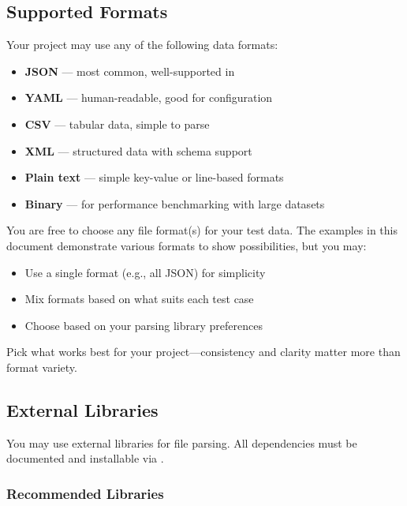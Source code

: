 \subsection{Supported Formats}

Your project may use any of the following data formats:

\begin{itemize}
  \item \textbf{JSON} --- most common, well-supported in \cpp
  \item \textbf{YAML} --- human-readable, good for configuration
  \item \textbf{CSV} --- tabular data, simple to parse
  \item \textbf{XML} --- structured data with schema support
  \item \textbf{Plain text} --- simple key-value or line-based formats
  \item \textbf{Binary} --- for performance benchmarking with large datasets
\end{itemize}

\begin{notebox}
You are free to choose any file format(s) for your test data. The examples in this document demonstrate various formats to show possibilities, but you may:
\begin{itemize}
  \item Use a single format (e.g., all JSON) for simplicity
  \item Mix formats based on what suits each test case
  \item Choose based on your parsing library preferences
\end{itemize}
Pick what works best for your project---consistency and clarity matter more than format variety.
\end{notebox}

\subsection{External Libraries}

You may use external libraries for file parsing. All dependencies must be documented and installable via \makedeps.

\subsubsection{Recommended Libraries}

